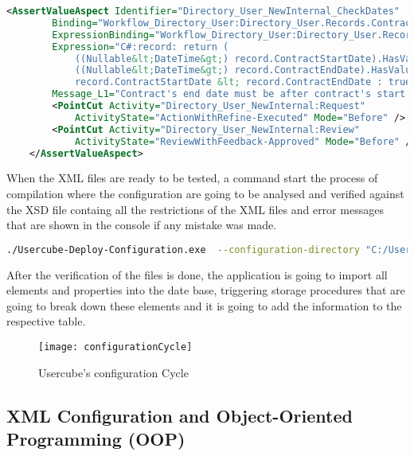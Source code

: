 \begin{lstlisting}[language=XML, caption=AssertValueAspect element example to check a date]
    <AssertValueAspect Identifier="Directory_User_NewInternal_CheckDates" 
        Binding="Workflow_Directory_User:Directory_User.Records.ContractEndDate" 
        ExpressionBinding="Workflow_Directory_User:Directory_User.Records"
        Expression="C#:record: return ( 
            ((Nullable&lt;DateTime&gt;) record.ContractStartDate).HasValue &&
            ((Nullable&lt;DateTime&gt;) record.ContractEndDate).HasValue) ?
            record.ContractStartDate &lt; record.ContractEndDate : true;"
        Message_L1="Contract's end date must be after contract's start date.">
        <PointCut Activity="Directory_User_NewInternal:Request"
            ActivityState="ActionWithRefine-Executed" Mode="Before" />
        <PointCut Activity="Directory_User_NewInternal:Review"
            ActivityState="ReviewWithFeedback-Approved" Mode="Before" />
    </AssertValueAspect>
\end{lstlisting}

When the XML files are ready to be tested, a command start the process of compilation where the configuration are going to be analysed and verified against the XSD file containg all the restrictions of the XML files and error messages that are shown in the console if any mistake was made.

\begin{lstlisting}[language=sh, caption=Shell command to execute the configuration delpoy]
./Usercube-Deploy-Configuration.exe  --configuration-directory "C:/Usercube/ExportedConf"
\end{lstlisting}

After the verification of the files is done, the application is going to import all elements and properties into the date base, triggering storage procedures that are going to break down these elements and it is going to add the information to the respective table.

\begin{figure}[htbp]
  \centering
  \texttt{[image: configurationCycle]}
  \caption{Usercube's configuration Cycle}
  \label{fig:configurationCycle}
\end{figure}

\subsection{XML Configuration and Object-Oriented Programming (OOP)}

